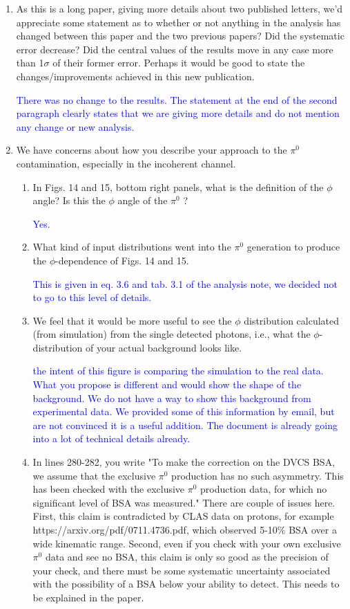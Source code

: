 \documentclass[a4paper,11pt,twoside]{article}
\begin{document}
\begin{enumerate}
\item  As this is a long paper, giving more details about two published letters, we'd appreciate some statement as
to whether or not anything in the analysis has changed between this paper and the two previous papers? Did
the systematic error decrease? Did the central values of the results move in any case more than 1$\sigma$ of their
former error. Perhaps it would be good to state the changes/improvements achieved in this new publication.

   \textcolor{blue}{There was no change to the results. The statement at the end of the second paragraph
clearly states that we are giving more details and do not mention any change or new analysis.}

\item  We have concerns about how you describe your approach to the $\pi^0$ contamination, especially in the incoherent
channel.
\begin{enumerate}
\item In Figs. 14 and 15, bottom right panels, what is the definition of the $\phi$ angle? Is this the $\phi$ angle of the
$\pi^0$ ?

   \textcolor{blue}{Yes.}

\item What kind of input distributions went into the $\pi^0$ generation to produce the $\phi$-dependence of Figs. 14
and 15.

   \textcolor{blue}{This is given in eq. 3.6 and tab. 3.1 of the analysis note, we decided not to go to this level 
   of details.}

\item We feel that it would be more useful to see the $\phi$ distribution calculated (from simulation) from the
single detected photons, i.e., what the $\phi$-distribution of your actual background looks like.

   \textcolor{blue}{the intent of this figure is comparing the simulation to the real data. What you propose is 
different and would show the shape of the background. We do not have a way to show this background from experimental 
data. We provided some of this information by email, but are not convinced it is a useful addition. The document is
already going into a lot of technical details already.}

\item In lines 280-282, you write "To make the correction on the DVCS BSA, we assume that the exclusive $\pi^0$
production has no such asymmetry. This has been checked with the exclusive $\pi^0$ production data, for
which no significant level of BSA was measured."
There are couple of issues here. First, this claim is contradicted by CLAS data on protons, for example
https://arxiv.org/pdf/0711.4736.pdf, which observed 5-10\% BSA over a wide kinematic range.
Second, even if you check with your own exclusive $\pi^0$ data and see no BSA, this claim is only so good as
the precision of your check, and there must be some systematic uncertainty associated with the possibility
of a BSA below your ability to detect. This needs to be explained in the paper.


\end{enumerate}
\end{enumerate}
\end{document}
